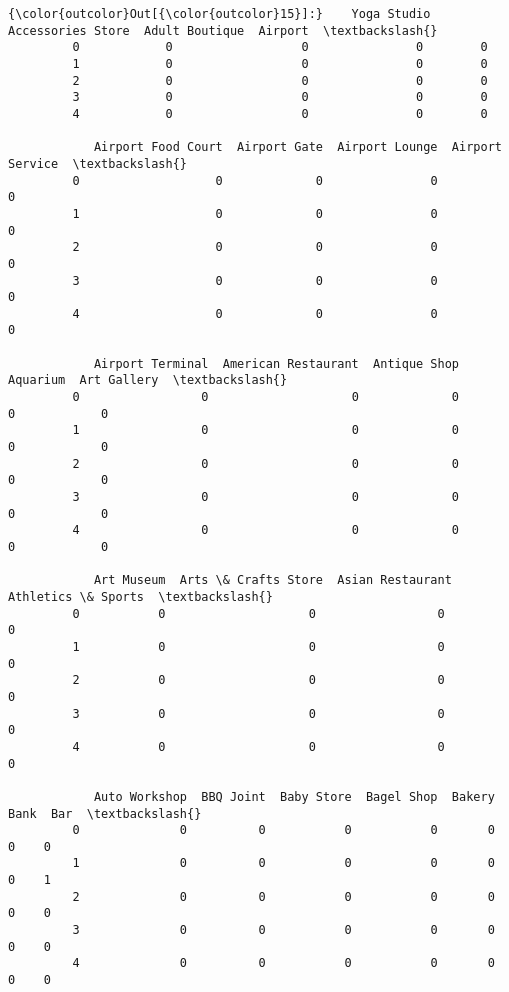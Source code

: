 \documentclass[11pt]{article}
\begin{document}
\begin{Verbatim}[commandchars=\\\{\}]
{\color{outcolor}Out[{\color{outcolor}15}]:}    Yoga Studio  Accessories Store  Adult Boutique  Airport  \textbackslash{}
         0            0                  0               0        0   
         1            0                  0               0        0   
         2            0                  0               0        0   
         3            0                  0               0        0   
         4            0                  0               0        0   
         
            Airport Food Court  Airport Gate  Airport Lounge  Airport Service  \textbackslash{}
         0                   0             0               0                0   
         1                   0             0               0                0   
         2                   0             0               0                0   
         3                   0             0               0                0   
         4                   0             0               0                0   
         
            Airport Terminal  American Restaurant  Antique Shop  Aquarium  Art Gallery  \textbackslash{}
         0                 0                    0             0         0            0   
         1                 0                    0             0         0            0   
         2                 0                    0             0         0            0   
         3                 0                    0             0         0            0   
         4                 0                    0             0         0            0   
         
            Art Museum  Arts \& Crafts Store  Asian Restaurant  Athletics \& Sports  \textbackslash{}
         0           0                    0                 0                   0   
         1           0                    0                 0                   0   
         2           0                    0                 0                   0   
         3           0                    0                 0                   0   
         4           0                    0                 0                   0   
         
            Auto Workshop  BBQ Joint  Baby Store  Bagel Shop  Bakery  Bank  Bar  \textbackslash{}
         0              0          0           0           0       0     0    0   
         1              0          0           0           0       0     0    1   
         2              0          0           0           0       0     0    0   
         3              0          0           0           0       0     0    0   
         4              0          0           0           0       0     0    0   
         

\end{Verbatim}
\end{document}
